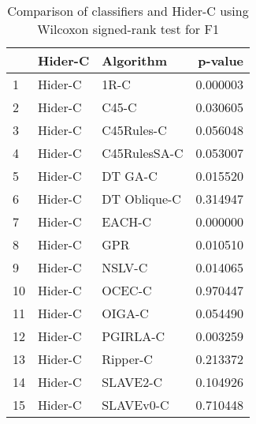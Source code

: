 \begin{table}
\footnotesize
\caption{Comparison of classifiers and Hider-C using Wilcoxon signed-rank test for F1}
\label{tab:Hider-C wilcoxon F1 comparison}
\begin{tabular}{lllr}
\hline
 & Hider-C & Algorithm & p-value \\
\hline
1 & Hider-C & 1R-C & 0.000003 \\
2 & Hider-C & C45-C & 0.030605 \\
3 & Hider-C & C45Rules-C & 0.056048 \\
4 & Hider-C & C45RulesSA-C & 0.053007 \\
5 & Hider-C & DT GA-C & 0.015520 \\
6 & Hider-C & DT Oblique-C & 0.314947 \\
7 & Hider-C & EACH-C & 0.000000 \\
8 & Hider-C & GPR & 0.010510 \\
9 & Hider-C & NSLV-C & 0.014065 \\
10 & Hider-C & OCEC-C & 0.970447 \\
11 & Hider-C & OIGA-C & 0.054490 \\
12 & Hider-C & PGIRLA-C & 0.003259 \\
13 & Hider-C & Ripper-C & 0.213372 \\
14 & Hider-C & SLAVE2-C & 0.104926 \\
15 & Hider-C & SLAVEv0-C & 0.710448 \\
\hline
\end{tabular}
\end{table}
